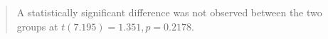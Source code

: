 \begin{quote}
	A statistically significant difference was not observed between the two groups at $t(7.195)=1.351, p = 0.2178$.
\end{quote}
